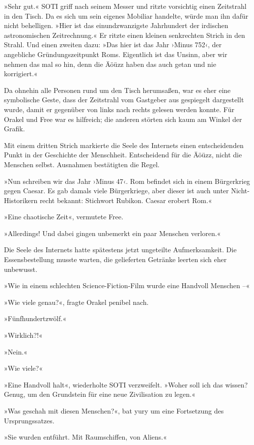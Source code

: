 »Sehr gut.« SOTI griff nach seinem Messer und ritzte vorsichtig einen Zeitstrahl in den Tisch. Da es sich um sein eigenes Mobiliar handelte, würde man ihn dafür nicht behelligen. »Hier ist das einundzwanzigste Jahrhundert der irdischen astronomischen Zeitrechnung.« Er ritzte einen kleinen senkrechten Strich in den Strahl. Und einen zweiten dazu: »Das hier ist das Jahr ›Minus 752‹, der angebliche Gründungszeitpunkt Roms. Eigentlich ist das Unsinn, aber wir nehmen das mal so hin, denn die Äöüzz haben das auch getan und nie korrigiert.«

Da ohnehin alle Personen rund um den Tisch herumsaßen, war es eher eine symbolische Geste, dass der Zeitstrahl vom Gastgeber aus gespiegelt dargestellt wurde, damit er gegenüber von links nach rechts gelesen werden konnte. Für Orakel und Free war es hilfreich; die anderen störten sich kaum am Winkel der Grafik.

Mit einem dritten Strich markierte die Seele des Internets einen entscheidenden Punkt in der Geschichte der Menschheit. Entscheidend für die Äöüzz, nicht die Menschen selbst. Ausnahmen bestätigten die Regel.

»Nun schreiben wir das Jahr ›Minus 47‹. Rom befindet sich in einem Bürgerkrieg gegen Caesar. Es gab damals viele Bürgerkriege, aber dieser ist auch unter Nicht-Historikern recht bekannt: Stichwort Rubikon. Caesar erobert Rom.«

»Eine chaotische Zeit«, vermutete Free.

»Allerdings! Und dabei gingen unbemerkt ein paar Menschen verloren.«

Die Seele des Internets hatte spätestens jetzt ungeteilte Aufmerksamkeit. Die Essensbestellung musste warten, die gelieferten Getränke leerten sich eher unbewusst.

»Wie in einem schlechten Science-Fiction-Film wurde eine Handvoll Menschen –«

»Wie viele genau?«, fragte Orakel penibel nach.

»Fünfhundertzwölf.«

»Wirklich?!«

»Nein.«

»Wie viele?«

»Eine Handvoll halt«, wiederholte SOTI verzweifelt. »Woher soll ich das wissen? Genug, um den Grundstein für eine neue Zivilisation zu legen.«

»Was geschah mit diesen Menschen?«, bat yury um eine Fortsetzung des Ursprungssatzes.

»Sie wurden entführt. Mit Raumschiffen, von Aliens.«


